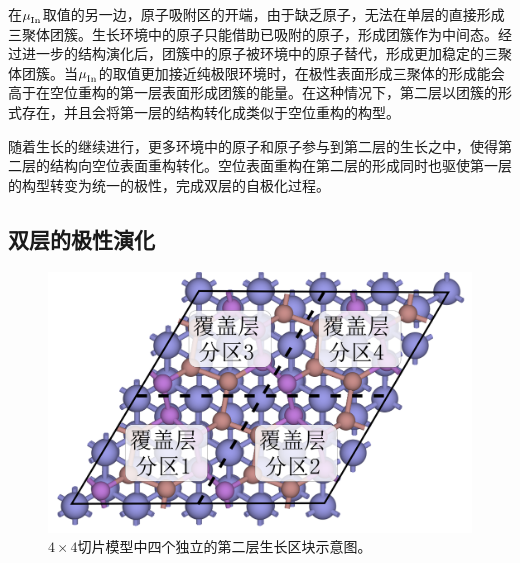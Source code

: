在$\it \mu_{\rm In}^{\rm } \it$取值的另一边，原子吸附区的开端，由于缺乏原子，无法在单层的直接形成三聚体团簇。生长环境中的原子只能借助已吸附的原子，形成团簇作为中间态。经过进一步的结构演化后，团簇中的原子被环境中的原子替代，形成更加稳定的三聚体团簇。当$\it \mu_{\rm In}^{\rm } \it$的取值更加接近纯极限环境时，在极性表面形成三聚体的形成能会高于在空位重构的第一层表面形成团簇的能量。在这种情况下，第二层以团簇的形式存在，并且会将第一层的结构转化成类似于空位重构的构型。

随着生长的继续进行，更多环境中的原子和原子参与到第二层的生长之中，使得第二层的结构向空位表面重构转化。空位表面重构在第二层的形成同时也驱使第一层的构型转变为统一的极性，完成双层的自极化过程。



\subsection{双层的极性演化}

\begin{figure}[htb]
    \includegraphics{pic/IS_diagram_2Linsb_partial.png}
    \caption{$4 \times 4$切片模型中四个独立的第二层生长区块示意图。}
    \label{fig:IS_diagram_2Linsb_partial}
\end{figure}

